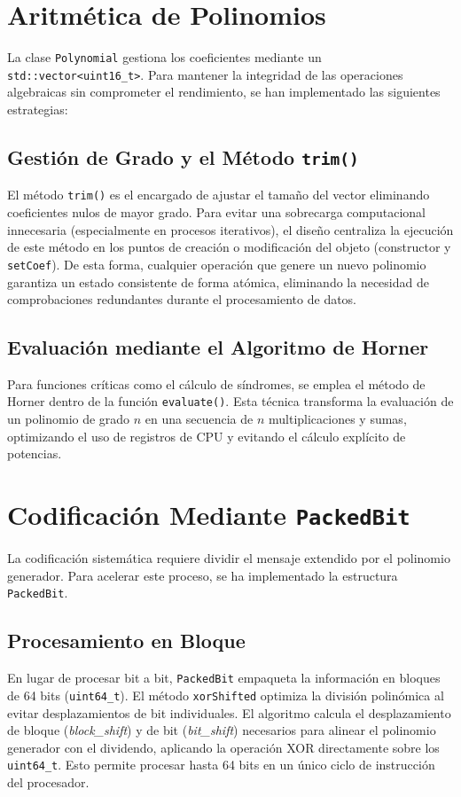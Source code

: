 \section{Aritmética de Polinomios}
La clase \texttt{Polynomial} gestiona los coeficientes mediante un \texttt{std::vector<uint16\_t>}. Para mantener la integridad de las operaciones algebraicas sin comprometer el rendimiento, se han implementado las siguientes estrategias:

\subsection{Gestión de Grado y el Método \texttt{trim()}}
El método \texttt{trim()} es el encargado de ajustar el tamaño del vector eliminando coeficientes nulos de mayor grado. Para evitar una sobrecarga computacional innecesaria (especialmente en procesos iterativos), el diseño centraliza la ejecución de este método en los puntos de creación o modificación del objeto (constructor y \texttt{setCoef}). De esta forma, cualquier operación que genere un nuevo polinomio garantiza un estado consistente de forma atómica, eliminando la necesidad de comprobaciones redundantes durante el procesamiento de datos.

\subsection{Evaluación mediante el Algoritmo de Horner}
Para funciones críticas como el cálculo de síndromes, se emplea el método de Horner dentro de la función \texttt{evaluate()}. Esta técnica transforma la evaluación de un polinomio de grado $n$ en una secuencia de $n$ multiplicaciones y sumas, optimizando el uso de registros de CPU y evitando el cálculo explícito de potencias.

\section{Codificación Mediante \texttt{PackedBit}}
La codificación sistemática requiere dividir el mensaje extendido por el polinomio generador. Para acelerar este proceso, se ha implementado la estructura \texttt{PackedBit}.

\subsection{Procesamiento en Bloque}
En lugar de procesar bit a bit, \texttt{PackedBit} empaqueta la información en bloques de 64 bits (\texttt{uint64\_t}). El método \texttt{xorShifted} optimiza la división polinómica al evitar desplazamientos de bit individuales. El algoritmo calcula el desplazamiento de bloque (\textit{block\_shift}) y de bit (\textit{bit\_shift}) necesarios para alinear el polinomio generador con el dividendo, aplicando la operación XOR directamente sobre los \texttt{uint64\_t}. Esto permite procesar hasta 64 bits en un único ciclo de instrucción del procesador.

